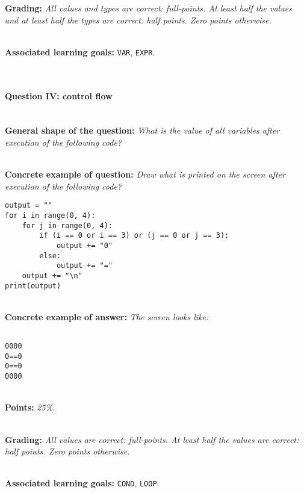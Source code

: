 \textbf{Grading:} \textit{All values and types are correct: full-points. At least half the values and at least half the types are correct: half points. Zero points otherwise.}

\ \\ 

\textbf{Associated learning goals:} \texttt{VAR}, \texttt{EXPR}.

\ \\ 

\paragraph{Question IV: control flow}

\ \\ 

\textbf{General shape of the question:} \textit{What is the value of all variables after execution of the following code?}

\ \\ 

\textbf{Concrete example of question:} \textit{Draw what is printed on the screen after execution of the following code?}

\begin{lstlisting}
output = ""
for i in range(0, 4):
    for j in range(0, 4):
        if (i == 0 or i == 3) or (j == 0 or j == 3):
            output += "0"
        else:
            output += "="
    output += "\n"
print(output)
\end{lstlisting}

\ \\ 

\textbf{Concrete example of answer:} \textit{The screen looks like:}
\begin{lstlisting}

0000
0==0
0==0
0000

\end{lstlisting}

\ \\ 

\textbf{Points:} \textit{25\%.}

\ \\ 

\textbf{Grading:} \textit{All values are correct: full-points. At least half the values are correct: half points. Zero points otherwise.}

\ \\ 

\textbf{Associated learning goals:} \texttt{COND}, \texttt{LOOP}.

\ \\ 
